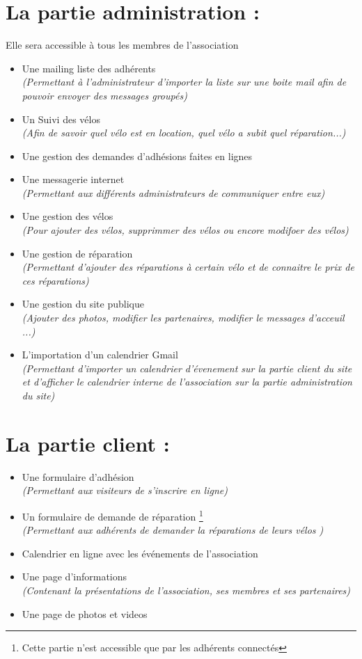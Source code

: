 \documentclass[11pt,a4paper,titlepage]{report}
\begin{document}
\section{La partie administration :} 
Elle sera accessible à tous les membres de l'association \\
\begin{itemize}
\item Une mailing liste des adhérents \\
\textit{(Permettant à l'administrateur d'importer la liste sur une boite mail afin de pouvoir envoyer des messages groupés)}
\item Un Suivi des vélos \\
\textit{(Afin de savoir quel vélo est en location, quel vélo a subit quel réparation...)}
\item Une gestion des demandes d'adhésions faites en lignes 
\item Une messagerie internet \\
\textit{(Permettant aux différents administrateurs de communiquer entre eux)}
\item Une gestion des vélos \\
\textit{(Pour ajouter des vélos, supprimmer des vélos ou encore modifoer des vélos)}
\item Une gestion de réparation \\
\textit{(Permettant d'ajouter des réparations à certain vélo et de connaitre le prix de ces réparations)}
\item Une gestion du site publique \\
\textit{(Ajouter des photos, modifier les partenaires, modifier le messages d'acceuil ...)}
\item L'importation d'un calendrier Gmail \\
\textit{(Permettant d'importer un calendrier d'évenement sur la partie client du site et d'afficher le calendrier interne de l'association sur la partie administration du site)}
\end{itemize}

  
  
\section{ La partie client :}

\begin{itemize}
\item Une formulaire d'adhésion \\
\textit{(Permettant aux visiteurs de s'inscrire en ligne)}
\item Un formulaire de demande de réparation \footnote{Cette partie n'est accessible que par les adhérents connectés}  \\
\textit{(Permettant aux adhérents de demander la réparations de leurs vélos )}
\item Calendrier en ligne avec les événements de l'association 
\item Une page d'informations  \\
\textit{(Contenant la présentations de l'association, ses membres et ses partenaires)} 
\item Une page de photos et videos  

\end{itemize}
\end{document}
